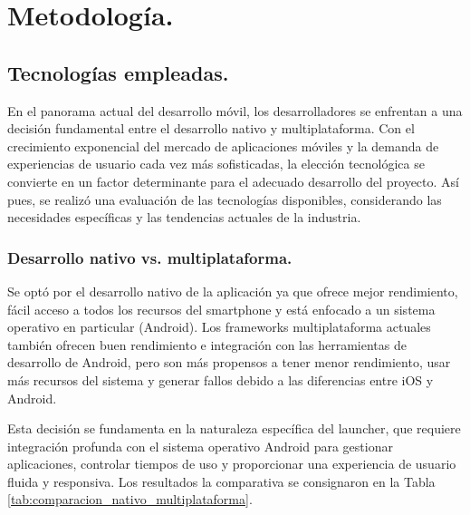 \section{Metodología.}
\label{sec:metodologia}

\subsection{Tecnologías empleadas.}

En el panorama actual del desarrollo móvil, los desarrolladores se enfrentan a una decisión fundamental entre el desarrollo nativo y multiplataforma. Con el crecimiento exponencial del mercado de aplicaciones móviles y la demanda de experiencias de usuario cada vez más sofisticadas, la elección tecnológica se convierte en un factor determinante para el adecuado desarrollo del proyecto. Así pues, se realizó una evaluación de las tecnologías disponibles, considerando las necesidades específicas y las tendencias actuales de la industria.


\subsubsection{Desarrollo nativo vs. multiplataforma.}

Se optó por el desarrollo nativo de la aplicación ya que ofrece mejor rendimiento, fácil acceso a todos los recursos del smartphone y está enfocado a un sistema operativo en particular (Android). Los frameworks multiplataforma actuales también ofrecen buen rendimiento e integración con las herramientas de desarrollo de Android, pero son más propensos a tener menor rendimiento, usar más recursos del sistema y generar fallos debido a las diferencias entre iOS y Android.

Esta decisión se fundamenta en la naturaleza específica del launcher, que requiere integración profunda con el sistema operativo Android para gestionar aplicaciones, controlar tiempos de uso y proporcionar una experiencia de usuario fluida y responsiva. Los resultados la comparativa se consignaron en la Tabla \ref{tab:comparacion_nativo_multiplataforma}.


